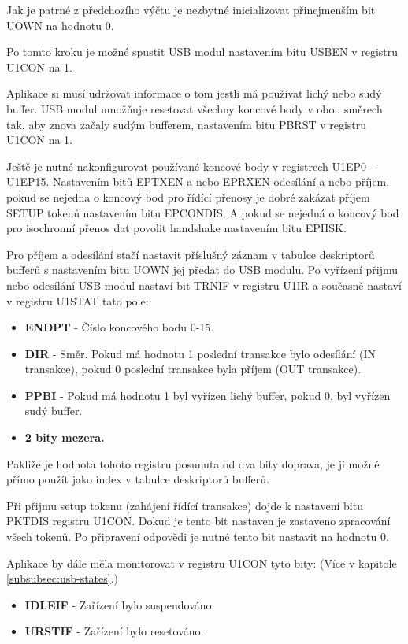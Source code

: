 Jak je patrné z předchozího výčtu je nezbytné inicializovat přinejmenším bit UOWN na hodnotu 0. 

Po tomto kroku je možné spustit USB modul nastavením bitu USBEN v registru U1CON na 1.

Aplikace si musí udržovat informace o tom jestli má používat lichý nebo sudý buffer. USB modul umožňuje resetovat všechny koncové body v obou směrech tak, aby znova začaly sudým bufferem, nastavením bitu PBRST v registru U1CON na 1.

Ještě je nutné nakonfigurovat používané koncové body v registrech U1EP0 - U1EP15. Nastavením bitů EPTXEN a nebo EPRXEN odesílání a nebo příjem, pokud se nejedna o koncový bod pro řídící přenosy je dobré zakázat příjem SETUP tokenů nastavením bitu EPCONDIS. A pokud se nejedná o koncový bod pro isochronní přenos dat povolit handshake nastavením bitu EPHSK. %

Pro příjem a odesílání stačí nastavit příslušný záznam v tabulce deskriptorů bufferů s nastavením bitu UOWN jej předat do USB modulu. Po vyřízení přijmu nebo odesílání USB modul nastaví bit TRNIF v registru U1IR a současně nastaví v registru U1STAT tato pole:
\begin{itemize}
\item \textbf{ENDPT} - Číslo koncového bodu 0-15.
\item \textbf{DIR} - Směr. Pokud má hodnotu 1 poslední transakce bylo odesílání (IN transakce), pokud 0 poslední transakce byla příjem (OUT transakce).
\item \textbf{PPBI} - Pokud má hodnotu 1 byl vyřízen lichý buffer, pokud 0, byl vyřízen sudý buffer.
\item \textbf{2 bity mezera.}
\end{itemize}

Pakliže je hodnota tohoto registru posunuta od dva bity doprava, je ji možné přímo použít jako index v tabulce deskriptorů bufferů.

Při přijmu setup tokenu (zahájení řídící transakce) dojde k nastavení bitu PKTDIS registru U1CON. Dokud je tento bit nastaven je zastaveno zpracování všech tokenů. Po připravení odpovědi je nutné tento bit nastavit na hodnotu 0.

Aplikace by dále měla monitorovat v registru U1CON tyto bity: (Více v kapitole \ref{subsubsec:usb-states}.)

\begin{itemize}
\item \textbf{IDLEIF} - Zařízení bylo suspendováno.
\item \textbf{URSTIF} - Zařízení bylo resetováno.
\end{itemize}



